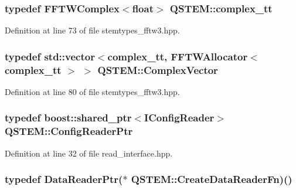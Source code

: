 \hypertarget{namespace_q_s_t_e_m_afa320ea3cd2f5ff080c422f81b803a32}{
\subsubsection[{complex\-\_\-tt}]{\setlength{\rightskip}{0pt plus 5cm}typedef {\bf F\-F\-T\-W\-Complex}$<$float$>$ {\bf Q\-S\-T\-E\-M\-::complex\-\_\-tt}}}\label{namespace_q_s_t_e_m_afa320ea3cd2f5ff080c422f81b803a32}


Definition at line 73 of file stemtypes\-\_\-fftw3.\-hpp.

\hypertarget{namespace_q_s_t_e_m_af210a2c1f9afae1deed746dcd9276221}{
\subsubsection[{Complex\-Vector}]{\setlength{\rightskip}{0pt plus 5cm}typedef {\bf std\-::vector}$<${\bf complex\-\_\-tt}, {\bf F\-F\-T\-W\-Allocator}$<${\bf complex\-\_\-tt} $>$ $>$ {\bf Q\-S\-T\-E\-M\-::\-Complex\-Vector}}}\label{namespace_q_s_t_e_m_af210a2c1f9afae1deed746dcd9276221}


Definition at line 80 of file stemtypes\-\_\-fftw3.\-hpp.

\hypertarget{namespace_q_s_t_e_m_af9424707fe9f6503298f49b41304bd35}{
\subsubsection[{Config\-Reader\-Ptr}]{\setlength{\rightskip}{0pt plus 5cm}typedef boost\-::shared\-\_\-ptr$<${\bf I\-Config\-Reader}$>$ {\bf Q\-S\-T\-E\-M\-::\-Config\-Reader\-Ptr}}}\label{namespace_q_s_t_e_m_af9424707fe9f6503298f49b41304bd35}


Definition at line 32 of file read\-\_\-interface.\-hpp.

\hypertarget{namespace_q_s_t_e_m_a3e396e1b9e670f80ea3a73126fe429a0}{
\subsubsection[{Create\-Data\-Reader\-Fn}]{\setlength{\rightskip}{0pt plus 5cm}typedef {\bf Data\-Reader\-Ptr}($\ast$ Q\-S\-T\-E\-M\-::\-Create\-Data\-Reader\-Fn)()}}\label{namespace_q_s_t_e_m_a3e396e1b9e670f80ea3a73126fe429a0}


